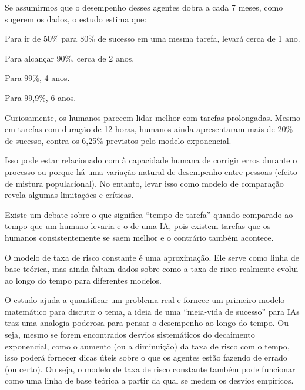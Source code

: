 {\subtitle{Previsão futura: Quanto tempo até melhorar?}
\hspace*{1.5em} Se assumirmos que o desempenho
desses agentes dobra a cada 7 meses, como
sugerem os dados, o estudo estima que:

\begin{hypeitemize}
\item Para ir de 50\% para 80\% de sucesso em uma mesma tarefa, levará cerca de 1 ano.
\item Para alcançar 90\%, cerca de 2 anos.
\item Para 99\%, 4 anos.
\item Para 99,9\%, 6 anos.
\end{hypeitemize}

\subtitle{Levar o pensamento humano}

\hspace*{1.5em} Curiosamente, os humanos parecem lidar melhor com tarefas prolongadas. Mesmo em tarefas com duração de 12 horas, humanos ainda apresentaram mais de 20\% de sucesso, contra os 6,25\% previstos pelo modelo exponencial.

\hspace*{1.5em} Isso pode estar relacionado com à capacidade humana de corrigir erros durante o processo ou porque há uma variação natural de desempenho entre pessoas (efeito de mistura populacional). No entanto, levar isso como modelo de comparação revela algumas limitações e críticas.

\subtitle{Limitações e críticas}

\begin{hypeitemize}
\item Existe um debate sobre o que significa “tempo de tarefa” quando comparado ao tempo que um humano levaria e o de uma IA, pois existem tarefas que os humanos consistentemente se saem melhor e o contrário também acontece.
\item O modelo de taxa de risco constante é uma aproximação. Ele serve como linha de base teórica, mas ainda faltam dados sobre como a taxa de risco realmente evolui ao longo do tempo para diferentes modelos.
\end{hypeitemize}

\subtitle{Conclusão}

\hspace*{1.5em} O estudo ajuda a quantificar um problema real e fornece um primeiro modelo matemático para discutir o tema, a ideia de uma “meia-vida de sucesso” para IAs traz uma analogia poderosa para pensar o desempenho ao longo do tempo. Ou seja, mesmo se forem encontrados desvios sistemáticos do decaimento exponencial, como o aumento (ou a diminuição) da taxa de risco com o tempo, isso poderá fornecer dicas úteis sobre o que os agentes estão fazendo de errado (ou certo). Ou seja, o modelo de taxa de risco constante também pode funcionar como uma linha de base teórica a partir da qual se medem os desvios empíricos.

}
